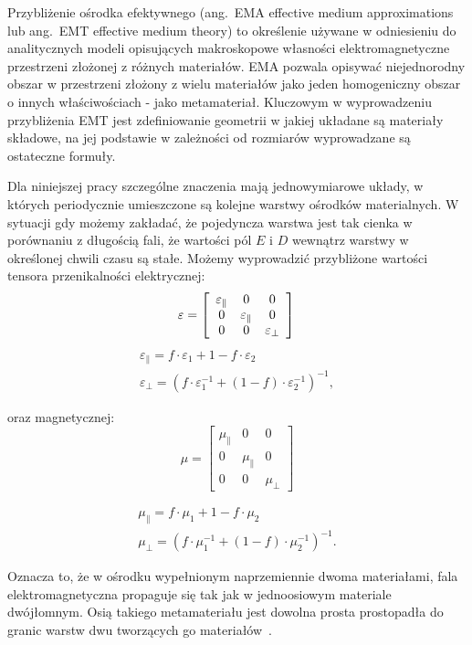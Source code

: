 \label{subart:effmedium}
Przybliżenie ośrodka efektywnego (ang.~EMA effective medium approximations lub ang.~EMT effective medium theory) to określenie używane w odniesieniu do analitycznych modeli opisujących makroskopowe własności elektromagnetyczne przestrzeni złożonej z różnych materiałów. EMA pozwala opisywać niejednorodny obszar w przestrzeni złożony z wielu materiałów jako jeden homogeniczny obszar o innych właściwościach - jako metamateriał. Kluczowym w wyprowadzeniu przybliżenia EMT jest zdefiniowanie geometrii w jakiej układane są materiały składowe, na jej podstawie w zależności od rozmiarów wyprowadzane są ostateczne formuły.

Dla niniejszej pracy szczególne znaczenia mają jednowymiarowe układy, w których periodycznie umieszczone są kolejne warstwy ośrodków materialnych. W sytuacji gdy możemy zakładać, że pojedyncza warstwa jest tak cienka w porównaniu z długością fali, że wartości pól $E$ i $D$ wewnątrz warstwy w określonej chwili czasu są stałe. Możemy wyprowadzić przybliżone wartości tensora przenikalności elektrycznej:
\[ \varepsilon= \left[ \begin{array}{ccc}
	\varepsilon_{\parallel} & 0 & 0 \\
	0 & \varepsilon_{\parallel} & 0 \\
	0 & 0 &  \varepsilon_{\perp} \end{array} \right] 
\\
\]
\begin{equation}
	\begin{gathered}
		\varepsilon_{\parallel}=f\cdot{\varepsilon_1}+{1-f}\cdot \varepsilon_2 \\ 
		\varepsilon_{\perp}=\left(f\cdot{\varepsilon_1^{-1}}+(1-f)\cdot \varepsilon_2^{-1}\right)^{-1},
	\end{gathered}
\label{eq:effmedium}
\end{equation}


oraz magnetycznej:
\[ \mu= \left[ \begin{array}{ccc}
					\mu_{\parallel} & 0 & 0 \\
					0 & \mu_{\parallel} & 0 \\
					0 & 0 &  \mu_{\perp} \end{array} \right]
\]

\begin{equation}
	\begin{gathered}
		\mu_{\parallel}=f\cdot{\mu_1}+{1-f}\cdot \mu_2 \\
		\mu_{\perp}=\left(f\cdot{\mu_1^{-1}}+(1-f)\cdot \mu_2^{-1}\right)^{-1}.
	\end{gathered}
\label{eq:effmedium-mu}
\end{equation}

Oznacza to, że w ośrodku wypełnionym naprzemiennie dwoma materiałami, fala elektromagnetyczna propaguje się tak jak w jednoosiowym materiale dwójłomnym. Osią takiego metamateriału jest dowolna prosta prostopadła do granic warstw dwu tworzących go materiałów~\cite{sihvola1999electromagnetic}.







